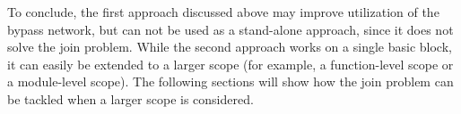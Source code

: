 To conclude, the first approach discussed above may improve utilization of the bypass network, but can not be used as a stand-alone approach, since it does not solve the join problem. While the second approach works on a single basic block, it can easily be extended to a larger scope (for example, a function-level scope or a module-level scope). The following sections will show how the join problem can be    tackled when a larger scope is considered. 






